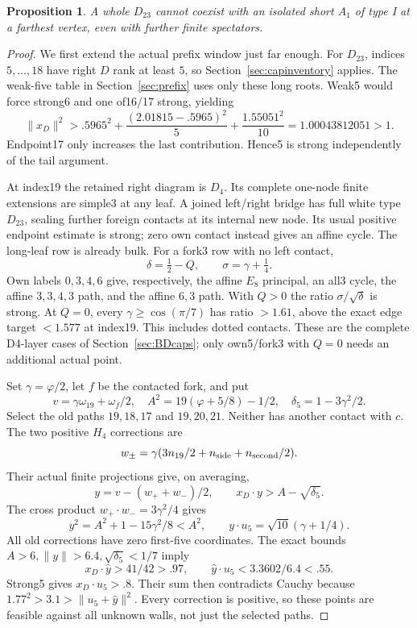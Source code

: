 \documentclass[11pt]{article}
\newtheorem{proposition}[theorem]{Proposition}
\theoremstyle{remark}
\newcommand{\ph}{\varphi}
\begin{document}
\begin{proposition}\label{prop:D23I}
A whole \(D_{23}\) cannot coexist with an isolated short \(A_1\)
of type I at a farthest vertex, even with further finite spectators.
\end{proposition}
\begin{proof}
We first extend the actual prefix window just far enough.
For \(D_{23}\), indices \(5,\ldots,18\) have right \(D\) rank
at least \(5\), so Section~\ref{sec:capinventory} applies. The weak-five
table in Section~\ref{sec:prefix} uses only these long roots.
Weak5 would force strong6 and one of16/17 strong, yielding
\[
 \|x_D\|^2>
 .5965^2+\frac{(2.01815-.5965)^2}{5}
                +\frac{1.55051^2}{10}
 =1.00043812051>1.
\]
Endpoint17 only increases the last contribution. Hence5 is strong
independently of the tail argument.

At index19 the retained right diagram is \(D_4\). Its complete
one-node finite extensions are simple3 at any leaf. A joined
left/right bridge has full white type \(D_{23}\), sealing further
foreign contacts at its internal new node. Its usual positive
endpoint estimate is strong; zero own contact instead gives an
affine cycle. The long-leaf row is already bulk.
For a fork3 row with no left contact,
\[
 \delta=\tfrac12-Q,\qquad \sigma=\gamma+\tfrac14.
\]
Own labels \(0,3,4,6\) give, respectively, the affine \(E_8\)
principal, an all3 cycle, the affine \(3,3,4,3\) path, and the
affine \(6,3\) path. With \(Q>0\) the ratio
\(\sigma/\sqrt\delta\) is strong. At \(Q=0\), every
\(\gamma\ge\cos(\pi/7)\) has ratio \(>1.61\), above the exact
edge target \(<1.577\) at index19. This includes dotted contacts.
These are the complete D4-layer cases of Section~\ref{sec:BDcaps}; only own5/fork3
with \(Q=0\) needs an additional actual point.

Set \(\gamma=\ph/2\), let \(f\) be the contacted fork, and put
\[
 v=\gamma\omega_{19}+\omega_f/2,\quad
 A^2=19(\ph+5/8)-1/2,\quad
 \delta_5=1-3\gamma^2/2.
\]
Select the old paths \(19,18,17\) and \(19,20,21\).
Neither has another contact with \(c\).
The two positive \(H_4\) corrections are
\[
 w_\pm=\gamma(3n_{19}/2+n_{\rm side}+n_{\rm second}/2).
\]
Their actual finite projections give, on averaging,
\[
 y=v-(w_++w_-)/2,\qquad x_D\cdot y>A-\sqrt{\delta_5}.
\]
The cross product \(w_+\cdot w_-=3\gamma^2/4\) gives
\[
 y^2=A^2+1-15\gamma^2/8<A^2,\qquad
 y\cdot u_5=\sqrt{10}(\gamma+1/4).
\]
All old corrections have zero first-five coordinates. The exact
bounds \(A>6,\|y\|>6.4,\sqrt{\delta_5}<1/7\) imply
\[
 x_D\cdot\widehat y>41/42>.97,\qquad
 \widehat y\cdot u_5<3.3602/6.4<.55 .
\]
Strong5 gives \(x_D\cdot u_5>.8\). Their sum then contradicts
Cauchy because \(1.77^2>3.1>\|u_5+\widehat y\|^2\).
Every correction is positive, so these points are feasible against
all unknown walls, not just the selected paths.


\end{proof}
\end{document}
